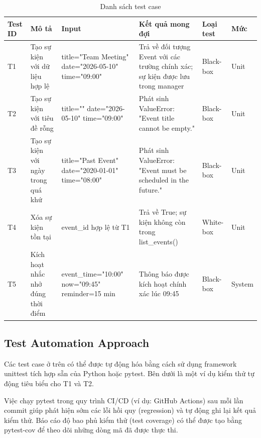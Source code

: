 \begin{table}[H]
\centering
\begin{tabularx}{\linewidth}{|l|X|X|X|l|l|}
\hline
\textbf{Test ID} & \textbf{Mô tả} & \textbf{Input} & \textbf{Kết quả mong đợi} & \textbf{Loại test} & \textbf{Mức} \\
\hline

T1 & Tạo sự kiện với dữ liệu hợp lệ &
title="Team Meeting" \newline date="2026-05-10" \newline time="09:00" & 
Trả về đối tượng Event với các trường chính xác; sự kiện được lưu trong manager &
Black-box & Unit \\
\hline

T2 & Tạo sự kiện với tiêu đề rỗng &
title="" \newline date="2026-05-10" \newline time="09:00" &
Phát sinh ValueError: "Event title cannot be empty." &
Black-box & Unit \\
\hline

T3 & Tạo sự kiện với ngày trong quá khứ &
title="Past Event" \newline date="2020-01-01" \newline time="08:00" &
Phát sinh ValueError: "Event must be scheduled in the future." &
Black-box & Unit \\
\hline

T4 & Xóa sự kiện tồn tại &
event\_id hợp lệ từ T1 &
Trả về True; sự kiện không còn trong list\_events() &
White-box & Unit \\
\hline

T5 & Kích hoạt nhắc nhở đúng thời điểm &
event\_time="10:00" \newline now="09:45" \newline reminder=15 min &
Thông báo được kích hoạt chính xác lúc 09:45 &
Black-box & System \\
\hline

\end{tabularx}
\caption{Danh sách test case}
\end{table}


\subsection{ Test Automation Approach}
Các test case ở trên có thể được tự động hóa bằng cách sử dụng framework unittest tích hợp sẵn của Python hoặc pytest. Bên dưới là một ví dụ kiểm thử tự động tiêu biểu cho T1 và T2.

Việc chạy pytest trong quy trình CI/CD (ví dụ: GitHub Actions) sau mỗi lần commit giúp phát hiện sớm các lỗi hồi quy (regression) và tự động ghi lại kết quả kiểm thử. Báo cáo độ bao phủ kiểm thử (test coverage) có thể được tạo bằng pytest-cov để theo dõi những dòng mã đã được thực thi.
